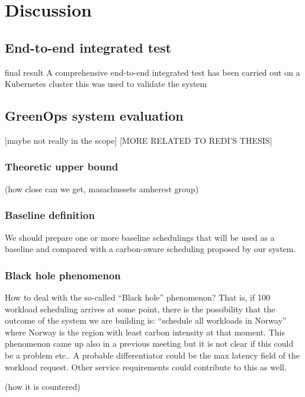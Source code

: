 \chapter{Discussion}
\label{cha:discussion}

\section{End-to-end integrated test}

final result
A comprehensive end-to-end integrated test has been carried out on a Kubernetes cluster
this was used to validate the system

\section{GreenOps system evaluation}

[maybe not really in the scope]
[MORE RELATED TO REDI'S THESIS]


\subsection{Theoretic upper bound}

 (how close can we get, masachussets amherest group)

\subsection{Baseline definition}

We should prepare one or more baseline schedulings that will be used as a baseline and compared with a carbon-aware scheduling proposed by our system.

\subsection{Black hole phenomenon}

How to deal with the so-called “Black hole” phenomenon?
That is, if 100 workload scheduling arrives at some point, there is the possibility that the outcome of the system we are building is: “schedule all workloads in Norway” where Norway is the region with least carbon intensity at that moment.
This phenomenon came up also in a previous meeting but it is not clear if this could be a problem etc..
A probable differentiator could be the max latency field of the workload request. Other service requirements could contribute to this as well.


(how it is countered)

